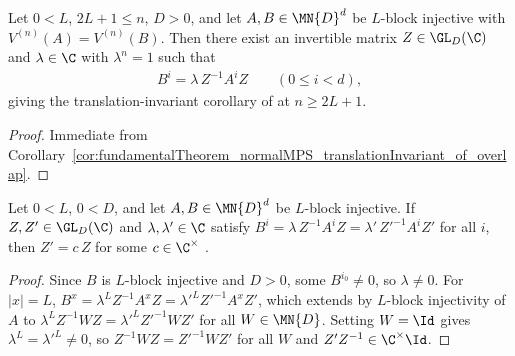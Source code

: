 \begin{corollary}%
    \label{cor:fundamentalTheorem_normalMPS_translationInvariant}
    \leanok
    Let $0 < L$, $2L + 1 \le n$, $D>0$, and let $A,B\in\MN{D}^d$ be $L$-block
    injective with $V^{(n)}(A) = V^{(n)}(B)$. Then there exist an invertible
    matrix $Z\in\GL_D(\C)$ and $\lambda\in\C$ with $\lambda^n = 1$ such that
    \begin{align}
        B^i = \lambda\, Z^{-1} A^i Z
        \qquad (0\le i<d),
        \label{eq:peps_normal_mps_ti_gauge}
    \end{align}
    giving the translation-invariant corollary of
    \cite[Section~4]{Molnar2018NormalPEPS} at $n\ge 2L+1$.
\end{corollary}
\begin{proof}\leanok
    Immediate from
    Corollary~\ref{cor:fundamentalTheorem_normalMPS_translationInvariant_of_overlap}.
\end{proof}

\begin{corollary}%
    \label{cor:fundamentalTheorem_normalMPS_translationInvariant_gauge_unique}
    \leanok
    Let $0 < L$, $0<D$, and let $A,B\in\MN{D}^d$ be $L$-block injective. If
    $Z,Z'\in\GL_D(\C)$ and $\lambda,\lambda'\in\C$ satisfy
    $B^i = \lambda\, Z^{-1} A^i Z = \lambda'\, Z'^{-1} A^i Z'$ for all $i$, then
    $Z' = c\,Z$ for some $c\in\C^\times$
    \cite[Section~4]{Molnar2018NormalPEPS}.
\end{corollary}
\begin{proof}\leanok
    Since $B$ is $L$-block injective and $D>0$, some $B^{i_0}\neq 0$, so
    $\lambda\neq 0$. For $|x|=L$,
    $B^x = \lambda^L Z^{-1} A^x Z = \lambda'^L Z'^{-1} A^x Z'$, which extends by
    $L$-block injectivity of $A$ to $\lambda^L Z^{-1} W Z = \lambda'^L Z'^{-1} W Z'$
    for all $W\in\MN{D}$. Setting $W=\Id$ gives $\lambda^L=\lambda'^L\neq 0$,
    so $Z^{-1} W Z = Z'^{-1} W Z'$ for all $W$ and $Z' Z^{-1}\in\C^\times\Id$.
\end{proof}

